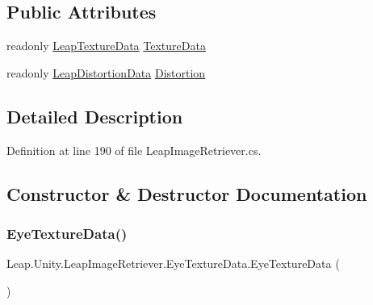 \subsection*{Public Attributes}
\begin{DoxyCompactItemize}
\item 
readonly \mbox{\hyperlink{class_leap_1_1_unity_1_1_leap_image_retriever_1_1_leap_texture_data}{Leap\+Texture\+Data}} \mbox{\hyperlink{class_leap_1_1_unity_1_1_leap_image_retriever_1_1_eye_texture_data_af1d86d2f2714d72b92ef33feed2d4a14}{Texture\+Data}}
\item 
readonly \mbox{\hyperlink{class_leap_1_1_unity_1_1_leap_image_retriever_1_1_leap_distortion_data}{Leap\+Distortion\+Data}} \mbox{\hyperlink{class_leap_1_1_unity_1_1_leap_image_retriever_1_1_eye_texture_data_af86473848f26141673ed248da09636d5}{Distortion}}
\end{DoxyCompactItemize}


\subsection{Detailed Description}


Definition at line 190 of file Leap\+Image\+Retriever.\+cs.



\subsection{Constructor \& Destructor Documentation}
\mbox{\label{class_leap_1_1_unity_1_1_leap_image_retriever_1_1_eye_texture_data_a0e0cda447dce9a396814be0bd1903c32}} 
\subsubsection{\texorpdfstring{EyeTextureData()}{EyeTextureData()}}
{\footnotesize\ttfamily Leap.\+Unity.\+Leap\+Image\+Retriever.\+Eye\+Texture\+Data.\+Eye\+Texture\+Data (\begin{DoxyParamCaption}{ }\end{DoxyParamCaption})}



